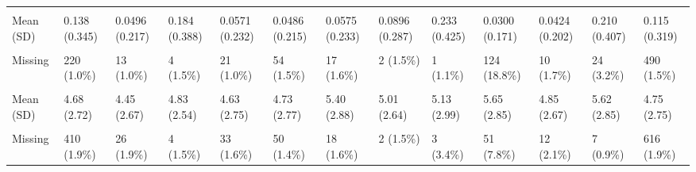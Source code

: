 \documentclass[
  single column]{article}
\begin{document}
\begin{landscape}
\begin{longtable}[t]{lllllllllllll}
\cellcolor{gray!10}{not\_heterosexual\_binary} & \cellcolor{gray!10}{} & \cellcolor{gray!10}{} & \cellcolor{gray!10}{} & \cellcolor{gray!10}{} & \cellcolor{gray!10}{} & \cellcolor{gray!10}{} & \cellcolor{gray!10}{} & \cellcolor{gray!10}{} & \cellcolor{gray!10}{} & \cellcolor{gray!10}{} & \cellcolor{gray!10}{} & \cellcolor{gray!10}{}\\
Mean (SD) & 0.138 (0.345) & 0.0496 (0.217) & 0.184 (0.388) & 0.0571 (0.232) & 0.0486 (0.215) & 0.0575 (0.233) & 0.0896 (0.287) & 0.233 (0.425) & 0.0300 (0.171) & 0.0424 (0.202) & 0.210 (0.407) & 0.115 (0.319)\\
\addlinespace
\cellcolor{gray!10}{Median [Min, Max]} & \cellcolor{gray!10}{0 [0, 1.00]} & \cellcolor{gray!10}{0 [0, 1.00]} & \cellcolor{gray!10}{0 [0, 1.00]} & \cellcolor{gray!10}{0 [0, 1.00]} & \cellcolor{gray!10}{0 [0, 1.00]} & \cellcolor{gray!10}{0 [0, 1.00]} & \cellcolor{gray!10}{0 [0, 1.00]} & \cellcolor{gray!10}{0 [0, 1.00]} & \cellcolor{gray!10}{0 [0, 1.00]} & \cellcolor{gray!10}{0 [0, 1.00]} & \cellcolor{gray!10}{0 [0, 1.00]} & \cellcolor{gray!10}{0 [0, \vphantom{1} 1.00]}\\
Missing & 220 (1.0\%) & 13 (1.0\%) & 4 (1.5\%) & 21 (1.0\%) & 54 (1.5\%) & 17 (1.6\%) & 2 (1.5\%) & 1 (1.1\%) & 124 (18.8\%) & 10 (1.7\%) & 24 (3.2\%) & 490 (1.5\%)\\
\cellcolor{gray!10}{nz\_dep2018} & \cellcolor{gray!10}{} & \cellcolor{gray!10}{} & \cellcolor{gray!10}{} & \cellcolor{gray!10}{} & \cellcolor{gray!10}{} & \cellcolor{gray!10}{} & \cellcolor{gray!10}{} & \cellcolor{gray!10}{} & \cellcolor{gray!10}{} & \cellcolor{gray!10}{} & \cellcolor{gray!10}{} & \cellcolor{gray!10}{}\\
Mean (SD) & 4.68 (2.72) & 4.45 (2.67) & 4.83 (2.54) & 4.63 (2.75) & 4.73 (2.77) & 5.40 (2.88) & 5.01 (2.64) & 5.13 (2.99) & 5.65 (2.85) & 4.85 (2.67) & 5.62 (2.85) & 4.75 (2.75)\\
\cellcolor{gray!10}{Median [Min, Max]} & \cellcolor{gray!10}{4.00 [1.00, 10.0]} & \cellcolor{gray!10}{4.00 [1.00, 10.0]} & \cellcolor{gray!10}{5.00 [1.00, 10.0]} & \cellcolor{gray!10}{4.00 [1.00, 10.0]} & \cellcolor{gray!10}{4.00 [1.00, 10.0]} & \cellcolor{gray!10}{5.00 [1.00, 10.0]} & \cellcolor{gray!10}{5.00 [1.00, 10.0]} & \cellcolor{gray!10}{5.00 [1.00, 10.0]} & \cellcolor{gray!10}{6.00 [1.00, 10.0]} & \cellcolor{gray!10}{5.00 [1.00, 10.0]} & \cellcolor{gray!10}{6.00 [1.00, 10.0]} & \cellcolor{gray!10}{4.00 [1.00, 10.0]}\\
\addlinespace
Missing & 410 (1.9\%) & 26 (1.9\%) & 4 (1.5\%) & 33 (1.6\%) & 50 (1.4\%) & 18 (1.6\%) & 2 (1.5\%) & 3 (3.4\%) & 51 (7.8\%) & 12 (2.1\%) & 7 (0.9\%) & 616 (1.9\%)\\

\end{longtable}
\end{landscape}
\end{document}
